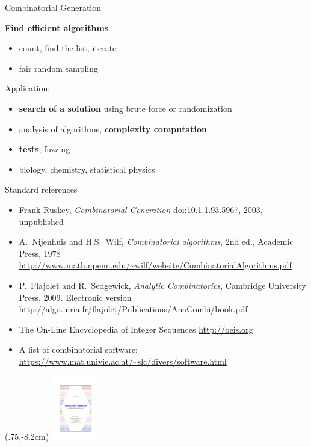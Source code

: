 \documentclass[compress,11pt]{beamer}
\begin{document}
\begin{frame}{Combinatorial Generation}

  \begin{QUESTION}
    \textbf{Find efficient algorithms}
    \begin{itemize}
    \item count, find the list, iterate
    \item fair random sampling
    \end{itemize}
  \end{QUESTION}
  Application:
  \begin{itemize}
  \item \textbf{search of a solution} using brute force or randomization
  \item analysis of algorithms, \textbf{complexity computation}
  \item \textbf{tests}, fuzzing
  \item biology, chemistry, statistical physics
  \end{itemize}
\end{frame}

\begin{frame}{Standard references}
  \small

  \begin{itemize}
  \item Frank Ruskey, \textit{Combinatorial Generation}
    \url{doi:10.1.1.93.5967}, 2003, unpublished

  \item A.~Nijenhuis and H.S.~Wilf, \textit{Combinatorial algorithms}, 2nd
    ed., Academic Press, 1978\\
    {\tiny\url{http://www.math.upenn.edu/~wilf/website/CombinatorialAlgorithms.pdf}}

  \item P.~Flajolet and R.~Sedgewick, \textit{Analytic Combinatorics},
    Cambridge University Press, 2009. Electronic version
    {\tiny\url{http://algo.inria.fr/flajolet/Publications/AnaCombi/book.pdf}}

  \item The On-Line Encyclopedia of Integer Sequences \url{http://oeis.org}
  \item A list of combinatorial software:
    {\tiny\url{https://www.mat.univie.ac.at/~slc/divers/software.html}}
  \end{itemize}
  \begin{textblock*}{100mm}(.75\textwidth,-8.2cm)
    \includegraphics[width=2cm]{media/RuskeyCombGen-1.pdf}
  \end{textblock*}
\end{frame}
\end{document}

